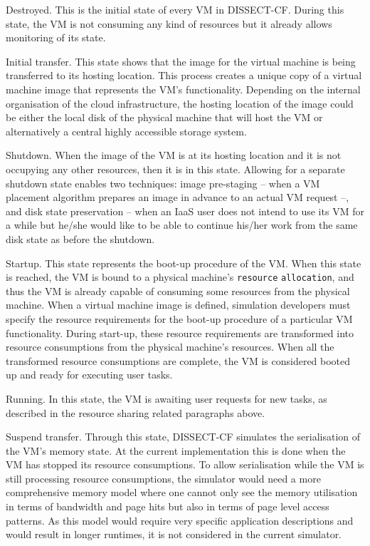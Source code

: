 \documentclass[sort, compress, 5p]{elsarticle}
\begin{document}
\begin{description*}
\item[Destroyed.] This is the initial state of every VM in DISSECT-CF. During this state, the VM is not consuming any kind of resources but it already allows monitoring of its state.
\item[Initial transfer.] This state shows that the image for the virtual machine is being transferred to its hosting location. This process creates a unique copy of a virtual machine image that represents the VM's functionality. Depending on the internal organisation of the cloud infrastructure, the hosting location of the image could be either the local disk of the physical machine that will host the VM or alternatively a central highly accessible storage system.
\item[Shutdown.] When the image of the VM is at its hosting location and it is not occupying any other resources, then it is in this state. Allowing for a separate shutdown state enables two  techniques:  image pre-staging -- when a VM placement algorithm prepares an image in advance to an actual VM request --, and  disk state preservation -- when an IaaS user does not intend to use its VM for a while but he/she would like to be able to continue his/her work from the same disk state as before the shutdown. 
\item[Startup.] This state represents the boot-up procedure of the VM. When this state is reached, the VM is bound to a physical machine's \verb+resource+ \verb+allocation+, and thus the VM is already capable of consuming some resources from the physical machine. When a virtual machine image is defined, simulation developers must specify the resource requirements for the boot-up procedure of a particular VM functionality. During start-up, these resource requirements are transformed into resource consumptions from the physical machine's resources. When all the transformed resource consumptions are complete, the VM is considered booted up and ready for executing user tasks.
\item[Running.] In this state, the VM is awaiting user requests for new tasks, as described in the resource sharing related paragraphs above.
\item[Suspend transfer.] Through this state, DISSECT-CF simulates the serialisation of the  VM's memory state. At the current implementation this is done when the VM has stopped its resource consumptions. To allow serialisation while the VM is still processing resource consumptions, the simulator would need a more comprehensive memory model where one cannot only see the memory utilisation in terms of bandwidth and page hits but also in terms of page level access patterns. As this model would require very specific application descriptions and would result in longer runtimes, it is not considered in the current simulator.

\end{description*}
\end{document}
